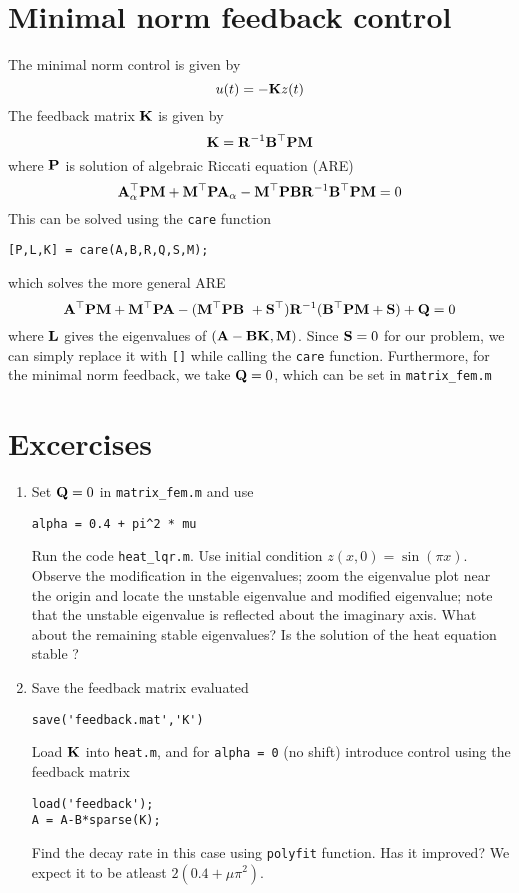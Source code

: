 \documentclass[12pt]{article}
\begin{document}
\section{Minimal norm feedback control}
The minimal norm control is given by
\[
u(t) = - {\mathbf K} z (t)
\]
The feedback matrix ${\mathbf K}$ is given by
\[
{\mathbf K} = {\mathbf R}^{-1} {\mathbf B}^\top {\mathbf P} {\mathbf M}
\]
where ${\mathbf P}$ is solution of algebraic Riccati equation (ARE)
\[
{\mathbf A}^\top_\alpha {\mathbf P} {\mathbf M} + {\mathbf M}^\top {\mathbf P} {\mathbf A}_\alpha - {\mathbf M}^\top {\mathbf P} {\mathbf B} {\mathbf R}^{-1} {\mathbf B}^\top {\mathbf P} {\mathbf M}  = 0
\]
This can be solved using the {\tt care} function
\begin{lstlisting}
[P,L,K] = care(A,B,R,Q,S,M);
\end{lstlisting}
which solves the more general ARE
\[
{\mathbf A}^\top {\mathbf P} {\mathbf M} + {\mathbf M}^\top {\mathbf P} {\mathbf A} - ({\mathbf M}^\top {\mathbf P} {\mathbf B} \ + {\mathbf S}^\top)  {\mathbf R}^{-1} ({\mathbf B}^\top {\mathbf P} {\mathbf M} +{\mathbf S}) + {\mathbf Q} = 0
\]
where ${\mathbf L}$ gives the eigenvalues of $({\mathbf A}- {\mathbf B} {\mathbf K},{\mathbf M})$. Since ${\mathbf S}=0$ for our problem, we can simply replace it with {\tt []} while calling the {\tt care} function. Furthermore, for the minimal norm feedback, we take ${\mathbf Q}=0$, which can be set in {\tt matrix\_fem.m}
\section{Excercises}

\begin{enumerate}
\item Set ${\mathbf Q}=0$ in {\tt matrix\_fem.m} and use
\begin{lstlisting}
alpha = 0.4 + pi^2 * mu
\end{lstlisting}
Run the code {\tt heat\_lqr.m}. Use initial condition $z(x,0) = \sin(\pi x)$. Observe the modification in the eigenvalues; zoom the eigenvalue plot near the origin and locate the unstable eigenvalue and modified eigenvalue; note that the unstable eigenvalue is reflected about the imaginary axis. What about the remaining stable eigenvalues? Is the solution of the heat equation stable ?

\item Save the feedback matrix evaluated
\begin{lstlisting}
save('feedback.mat','K')
\end{lstlisting}
Load ${\mathbf K}$ into {\tt heat.m}, and for {\tt alpha = 0} (no shift) introduce control using the feedback matrix
\begin{lstlisting}
load('feedback');
A = A-B*sparse(K);
\end{lstlisting}
Find the decay rate in this case using {\tt polyfit} function. Has it improved? We expect it to be atleast $2(0.4 + \mu \pi^2)$.

\end{enumerate}
\end{document}
